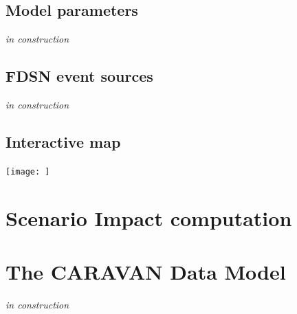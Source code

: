 \documentclass[12p]{article}
\begin{document}
\subsection{Model parameters}
\emph{in construction}

\subsection{FDSN event sources}
\emph{in construction}

\subsection{Interactive map}

\begin{center}
	\texttt{[image: ]}
\end{center}

\section{Scenario Impact computation}


\section{The CARAVAN Data Model}
\emph{in construction}
\end{document}
